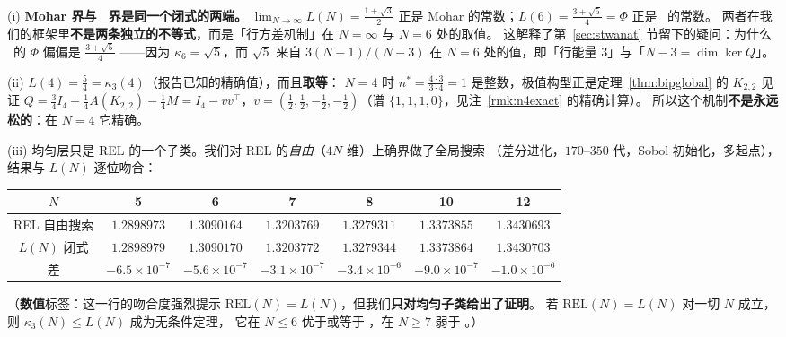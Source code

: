 \begin{remark}[这条定理为什么值得单独立一条]\label{rmk:LNread}
(i) \textbf{Mohar 界与 \STW\ 界是同一个闭式的两端。}
$\lim_{N\to\infty}L(N)=\frac{1+\sqrt3}2$ 正是 Mohar 的常数；$L(6)=\frac{3+\sqrt5}4=\Phi$ 正是 \STW\ 的常数。
两者在我们的框架里\textbf{不是两条独立的不等式}，而是「行方差机制」在 $N=\infty$ 与 $N=6$ 处的取值。
这解释了第~\ref{sec:stwanat} 节留下的疑问：为什么 \STW\ 的 $\Phi$ 偏偏是 $\frac{3+\sqrt5}4$
——因为 $\kappa_6=\sqrt5$，而 $\sqrt5$ 来自 $3(N-1)/(N-3)$ 在 $N=6$ 处的值，即「行能量 $3$」与「$N-3=\dim\ker Q$」。

(ii) $L(4)=\frac54=\kappa_3(4)$（报告已知的精确值），而且\textbf{取等}：
$N=4$ 时 $n^*=\frac{4\cdot3}{3\cdot4}=1$ 是整数，极值构型正是定理~\ref{thm:bipglobal} 的
$K_{2,2}$ 见证 $Q=\frac34I_4+\frac14A(K_{2,2})-\frac14M=I_4-vv^\top$，$v=(\frac12,\frac12,-\frac12,-\frac12)$（谱 $\{1,1,1,0\}$，见注~\ref{rmk:n4exact} 的精确计算）。
所以这个机制\textbf{不是永远松的}：在 $N=4$ 它精确。

(iii) 均匀层只是 REL 的一个子类。我们对 REL 的\emph{自由}（$4N$ 维）上确界做了全局搜索
（差分进化，$170$--$350$ 代，Sobol 初始化，多起点），结果与 $L(N)$ 逐位吻合：
\begin{center}\small
\begin{tabular}{c|cccccc}
\toprule
$N$ & 5 & 6 & 7 & 8 & 10 & 12\\
\midrule
REL 自由搜索 & $1.2898973$ & $1.3090164$ & $1.3203769$ & $1.3279311$ & $1.3373855$ & $1.3430693$\\
$L(N)$ 闭式 & $1.2898979$ & $1.3090170$ & $1.3203772$ & $1.3279344$ & $1.3373864$ & $1.3430703$\\
差 & $-6.5\!\times\!10^{-7}$ & $-5.6\!\times\!10^{-7}$ & $-3.1\!\times\!10^{-7}$ & $-3.4\!\times\!10^{-6}$ & $-9.0\!\times\!10^{-7}$ & $-1.0\!\times\!10^{-6}$\\
\bottomrule
\end{tabular}
\end{center}
（\textbf{数值}标签：这一行的吻合度强烈提示 $\mathrm{REL}(N)=L(N)$，但我们\textbf{只对均匀子类给出了证明}。
若 $\mathrm{REL}(N)=L(N)$ 对一切 $N$ 成立，则 $\kappa_3(N)\le L(N)$ 成为无条件定理，
它在 $N\le6$ 优于或等于 \STW，在 $N\ge7$ 弱于 \STW。）
\end{remark}

